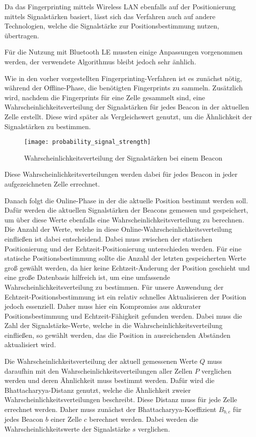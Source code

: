 Da das Fingerprinting mittels Wireless LAN ebenfalls auf der Positionierung mittels Signalstärken basiert, lässt sich das Verfahren auch auf andere Technologien, welche die Signalstärke zur Positionsbestimmung nutzen, übertragen.

Für die Nutzung mit Bluetooth LE mussten einige Anpassungen vorgenommen werden, der verwendete Algorithmus bleibt jedoch sehr änhlich.

Wie in den vorher vorgestellten Fingerprinting-Verfahren ist es zunächst nötig, während der Offline-Phase, die benötigten Fingerprints zu sammeln.
Zusätzlich wird, nachdem die Fingerprints für eine Zelle gesammelt sind, eine Wahrscheinlichkeitsverteilung der Signalstärken für jedes Beacon in der aktuellen Zelle erstellt. Diese wird später als Vergleichswert genutzt, um die Ähnlichkeit der Signalstärken zu bestimmen.

\begin{figure}[htb!]
		\centering
	\texttt{[image: probability\_signal\_strength]}
	\caption{Wahrscheinlichkeitsverteilung der Signalstärken bei einem Beacon}
	\label{probability-signal-strength-beacon}
\end{figure}

Diese Wahrscheinlichkeitsverteilungen werden dabei für jedes Beacon in jeder aufgezeichneten Zelle errechnet.

Danach folgt die Online-Phase in der die aktuelle Position bestimmt werden soll. Dafür werden die aktuellen Signalstärken der Beacons gemessen und gespeichert, um über diese Werte ebenfalls eine Wahrscheinlichkeitsverteilung zu berechnen. Die Anzahl der Werte, welche in diese Online-Wahrscheinlichkeitsverteilung einfließen ist dabei entscheidend.
Dabei muss zwischen der statischen Positionierung und der Echtzeit-Positionierung unterschieden werden.
Für eine statische Positionsbestimmung sollte die Anzahl der letzten gespeicherten Werte groß gewählt werden, da hier keine Echtzeit-Änderung der Position geschieht und eine große Datenbasis hilfreich ist, um eine umfassende Wahrscheinlichkeitsverteilung zu bestimmen.
Für unsere Anwendung der Echtzeit-Positionsbestimmung ist ein relativ schnelles Aktualisieren der Position jedoch essenziell. Daher muss hier ein Kompromiss aus akkurater Positionsbestimmung und Echtzeit-Fähigkeit gefunden werden. Dabei muss die Zahl der Signalstärke-Werte, welche in die Wahrscheinlichkeitsverteilung einfließen, so gewählt werden, das die Position in ausreichenden Abständen aktualisiert wird.

Die Wahrscheinlichkeitsverteilung der aktuell gemessenen Werte $Q$ muss daraufhin mit den Wahrscheinlichkeitsverteilungen aller Zellen $P$ verglichen werden und deren Ähnlichkeit muss bestimmt werden. Dafür wird die Bhattacharyya-Distanz genutzt, welche die Ähnlichkeit zweier Wahrscheinlichkeitsverteilungen beschreibt. 
Diese Distanz muss für jede Zelle errechnet werden. 
Daher muss zunächst der Bhattacharyya-Koeffizient $B_{b, c}$ für jedes Beacon $b$ einer Zelle $c$ berechnet werden. Dabei werden die Wahrscheinlichkeitswerte der Signalstärke $s$ verglichen.


